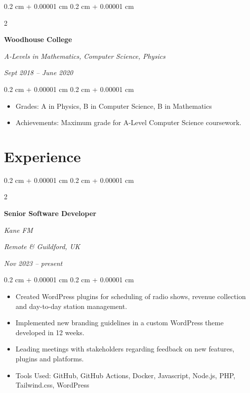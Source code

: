 \documentclass[10pt, letterpaper]{article}
\newenvironment{highlights}{
    \begin{itemize}[
        topsep=0.10 cm,
        parsep=0.10 cm,
        partopsep=0pt,
        itemsep=0pt,
        leftmargin=0.4 cm + 10pt
    ]
}{
    \end{itemize}
} %
\newenvironment{onecolentry}{
    \begin{adjustwidth}{
        0.2 cm + 0.00001 cm
    }{
        0.2 cm + 0.00001 cm
    }
}{
    \end{adjustwidth}
} %
\newenvironment{twocolentry}[2][]{
    \onecolentry
    \def\secondColumn{#2}
    \setcolumnwidth{\fill, 8 cm}
    \begin{paracol}{2}
}{
    \switchcolumn \raggedleft \secondColumn
    \end{paracol}
    \endonecolentry
} %
\begin{document}
        \vspace{0.2 cm}

        \begin{twocolentry}{
            
            
        \textit{Sept 2018 – June 2020}}
            \textbf{Woodhouse College}

            \textit{A-Levels in Mathematics, Computer Science, Physics}
        \end{twocolentry}

        \vspace{0.10 cm}
        \begin{onecolentry}
            \begin{highlights}
                \item Grades: A in Physics, B in Computer Science, B in Mathematics
                \item Achievements: Maximum grade for A-Level Computer Science coursework.
            \end{highlights}
        \end{onecolentry}



    
    \section{Experience}



        
        \begin{twocolentry}{
        \textit{Remote \& Guildford, UK}    
            
        \textit{Nov 2023 – present}}
            \textbf{Senior Software Developer}
            
            \textit{Kane FM}
        \end{twocolentry}

        \vspace{0.10 cm}
        \begin{onecolentry}
            \begin{highlights}
                \item Created WordPress plugins for scheduling of radio shows, revenue collection and day-to-day station management.
                \item Implemented new branding guidelines in a custom WordPress theme developed in 12 weeks.
                \item Leading meetings with stakeholders regarding feedback on new features, plugins and platforms.
                \item Tools Used: GitHub, GitHub Actions, Docker, Javascript, Node.js, PHP, Tailwind.css, WordPress
            \end{highlights}
        \end{onecolentry}
\end{document}
